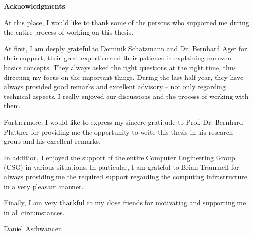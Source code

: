 

\clearpage 
\begin{center}
	\textbf{Acknowledgments} 
\end{center}

At this place, I would like to thank some of the persons who supported me during the entire process of working on this thesis.

At first, I am deeply grateful to Dominik Schatzmann and Dr. Bernhard Ager for their support, their great expertise and their patience in explaining me even basics concepts. 
They always asked the right questions at the right time, thus directing my focus on the important things. 
During the last half year, they have always provided good remarks and excellent advisory -- not only regarding technical aspects. 
I really enjoyed our discussions and the process of working with them. 

Furthermore, I would like to express my sincere gratitude to Prof. Dr. Bernhard Plattner for providing me the opportunity to write this thesis in his research group and his excellent remarks. 

In addition, I enjoyed the support of the entire Computer Engineering Group (CSG) in various situations. In particular, I am grateful to Brian Trammell for always providing me the required support regarding the computing infrastructure in a very pleasant manner. 

Finally, I am very thankful to my close friends for motivating and supporting me in all circumstances.

\vspace{1cm} Daniel Aschwanden 
\vfil
